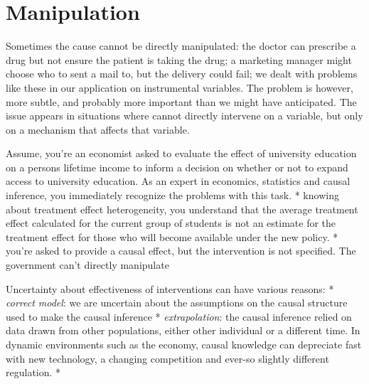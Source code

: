 \documentclass[
]{book}
\theoremstyle{definition}
\theoremstyle{definition}
\theoremstyle{definition}
\theoremstyle{remark}
\begin{document}
\hypertarget{manipulation}{%
\section{Manipulation}\label{manipulation}}

Sometimes the cause cannot be directly manipulated: the doctor can prescribe a drug but not ensure the patient is taking the drug; a marketing manager might choose who to sent a mail to, but the delivery could fail; we dealt with problems like these in our application on instrumental variables.
The problem is however, more subtle, and probably more important than we might have anticipated. The issue appears in situations where cannot directly intervene on a variable, but only on a mechanism that affects that variable.

Assume, you're an economist asked to evaluate the effect of university education on a persons lifetime income to inform a decision on whether or not to expand access to university education.
As an expert in economics, statistics and causal inference, you immediately recognize the problems with this task.
* knowing about treatment effect heterogeneity, you understand that the average treatment effect calculated for the current group of students is not an estimate for the treatment effect for those who will become available under the new policy.
* you're asked to provide a causal effect, but the intervention is not specified. The government can't directly manipulate

Uncertainty about effectiveness of interventions can have various reasons:
* \emph{correct model}: we are uncertain about the assumptions on the causal structure used to make the causal inference
* \emph{extrapolation}: the causal inference relied on data drawn from other populations, either other individual or a different time. In dynamic environments such as the economy, causal knowledge can depreciate fast with new technology, a changing competition and ever-so slightly different regulation.
*
\end{document}

